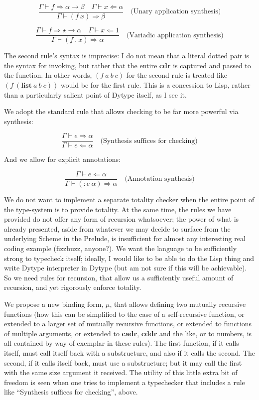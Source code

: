 \documentclass{article}
\begin{document}
\[ \frac{\Gamma\vdash f\mathbin{\Rightarrow}\alpha\to\beta\quad\Gamma\vdash
    x\mathbin{\Leftarrow}\alpha}{\Gamma\vdash
    (f~x)\mathbin{\Rightarrow}\beta}\quad\text{(Unary application synthesis)} \]

\[ \frac{\Gamma\vdash f\mathbin{\Rightarrow}\star\to\alpha\quad\Gamma\vdash
    x\mathbin{\Leftarrow}1}{\Gamma\vdash
    (f~.~x)\mathbin{\Rightarrow}\alpha}\quad\text{(Variadic application synthesis)} \]

The second rule's syntax is imprecise: I do not mean that a literal dotted pair
is the syntax for invoking, but rather that the entire \textbf{cdr} is captured
and passed to the function. In other words, $(f~a~b~c)$ for the second rule is
treated like $(f~(\textbf{list}~a~b~c))$ would be for the first rule. This is a
concession to Lisp, rather than a particularly salient point of Dytype itself,
as I see it.

We adopt the standard rule that allows checking to be far more powerful via
synthesis:

\[ \frac{\Gamma\vdash e\mathbin{\Rightarrow}\alpha}{\Gamma\vdash
    e\mathbin{\Leftarrow}\alpha}\quad\text{(Synthesis suffices for checking)} \]

And we allow for explicit annotations:

\[ \frac{\Gamma\vdash e\mathbin{\Leftarrow}\alpha}{\Gamma\vdash
    (: e~\alpha)\mathbin{\Rightarrow}\alpha}\quad\text{(Annotation synthesis)} \]

We do not want to implement a separate totality checker when the entire point of
the type-system is to provide totality. At the same time, the rules we have
provided do not offer any form of recursion whatsoever; the power of what is
already presented, aside from whatever we may decide to surface from the
underlying Scheme in the Prelude, is insufficient for almost any interesting
real coding example (fizzbuzz, anyone?). We want the language to be sufficiently
strong to typecheck itself; ideally, I would like to be able to do the Lisp
thing and write Dytype interpreter in Dytype (but am not sure if this will be
achievable). So we need rules for recursion, that allow us a sufficiently useful
amount of recursion, and yet rigorously enforce totality.

We propose a new binding form, $\mu$, that allows defining two mutually
recursive functions (how this can be simplified to the case of a self-recursive
function, or extended to a larger set of mutually recursive functions, or
extended to functions of multiple arguments, or extended to \textbf{cadr},
\textbf{cddr} and the like, or to numbers, is all contained by way of exemplar
in these rules). The first function, if it calls itself, must call itself back
with a substructure, and also if it calls the second. The second, if it calls
itself back, must use a substructure; but it may call the first with the same
size argument it received. The utility of this little extra bit of freedom is
seen when one tries to implement a typechecker that includes a rule like
``Synthesis suffices for checking'', above.
\end{document}
